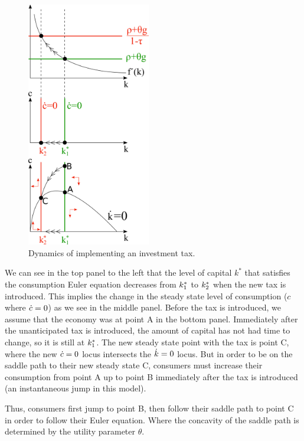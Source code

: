 \documentclass[12pt]{article}
\begin{document}
\newpage{}
{
\begin{figure}
  \begin{center}
    \includegraphics[width=0.48\textwidth]{2.b}
  \end{center}
  \caption{Dynamics of implementing an investment tax.}
\end{figure}


\vspace{3em}

We can see in the top panel to the left that the level of capital $k^*$ that satisfies the consumption Euler equation decreases from $k^*_1$ to $k^*_2$ when the new tax is introduced. This implies the change in the steady state level of consumption ($c$ where $\dot c=0$) as we see in the middle panel. Before the tax is introduced, we assume that the economy was at point A in the bottom panel. Immediately after the unanticipated tax is introduced, the amount of capital has not had time to change, so it is still at $k^*_1$. The new steady state point with the tax is point C, where the new $\dot c=0$ locus intersects the $\dot k=0$ locus. But in order to be on the saddle path to their new steady state C, consumers must increase their consumption from point A up to point B immediately after the tax is introduced (an instantaneous jump in this model).

Thus, consumers first jump to point B, then follow their saddle path to point C in order to follow their Euler equation. Where the concavity of the saddle path is determined by the utility parameter $\theta$.

}
\end{document}
